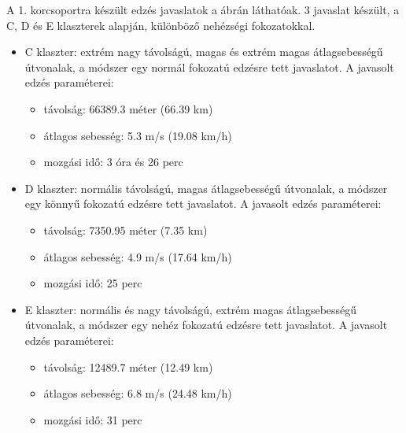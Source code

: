 \noindent A 1. korcsoportra készült edzés javaslatok a  ábrán láthatóak. 3 javaslat készült, a C, D és E klaszterek alapján, különböző nehézségi fokozatokkal. 
\begin{itemize}
	\item C klaszter: extrém nagy távolságú, magas és extrém magas átlagsebességű útvonalak, a módszer egy normál fokozatú edzésre tett javaslatot. A javasolt edzés paraméterei:
	\begin{itemize}
		\item távolság: 66389.3 méter (66.39 km)
		\item átlagos sebesség: 5.3 m/s (19.08 km/h)
		\item mozgási idő: 3 óra és 26 perc
	\end{itemize}
	\item D klaszter: normális távolságú, magas átlagsebességű útvonalak, a módszer egy könnyű fokozatú edzésre tett javaslatot. A javasolt edzés paraméterei:
	\begin{itemize}
		\item távolság: 7350.95 méter (7.35 km)
		\item átlagos sebesség: 4.9 m/s (17.64 km/h)
		\item mozgási idő: 25 perc
	\end{itemize}
	\item E klaszter: normális és nagy távolságú, extrém magas átlagsebességű útvonalak, a módszer egy nehéz fokozatú edzésre tett javaslatot. A javasolt edzés paraméterei:
	\begin{itemize}
		\item távolság: 12489.7 méter (12.49 km)
		\item átlagos sebesség: 6.8 m/s (24.48 km/h)
		\item mozgási idő: 31 perc
	\end{itemize}
\end{itemize}



